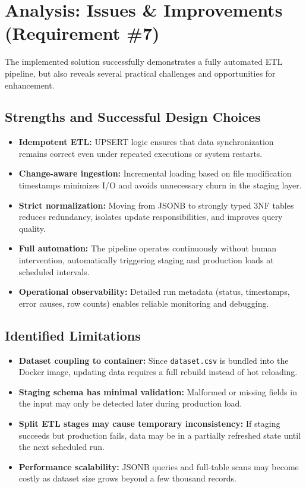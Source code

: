 \documentclass[11pt]{article}
\begin{document}
\section{Analysis: Issues \& Improvements (Requirement \#7)}

The implemented solution successfully demonstrates a fully automated ETL pipeline, but also reveals several practical challenges and opportunities for enhancement.

\subsection*{Strengths and Successful Design Choices}
\begin{itemize}[leftmargin=1.4em]
  \item \textbf{Idempotent ETL:} UPSERT logic ensures that data synchronization remains correct even under repeated executions or system restarts.
  \item \textbf{Change-aware ingestion:} Incremental loading based on file modification timestamps minimizes I/O and avoids unnecessary churn in the staging layer.
  \item \textbf{Strict normalization:} Moving from JSONB to strongly typed 3NF tables reduces redundancy, isolates update responsibilities, and improves query quality.
  \item \textbf{Full automation:} The pipeline operates continuously without human intervention, automatically triggering staging and production loads at scheduled intervals.
  \item \textbf{Operational observability:} Detailed run metadata (status, timestamps, error causes, row counts) enables reliable monitoring and debugging.
\end{itemize}

\subsection*{Identified Limitations}
\begin{itemize}[leftmargin=1.4em]
  \item \textbf{Dataset coupling to container:} Since \texttt{dataset.csv} is bundled into the Docker image, updating data requires a full rebuild instead of hot reloading.
  \item \textbf{Staging schema has minimal validation:} Malformed or missing fields in the input may only be detected later during production load.
  \item \textbf{Split ETL stages may cause temporary inconsistency:} If staging succeeds but production fails, data may be in a partially refreshed state until the next scheduled run.
  \item \textbf{Performance scalability:} JSONB queries and full-table scans may become costly as dataset size grows beyond a few thousand records.
\end{itemize}
\end{document}
